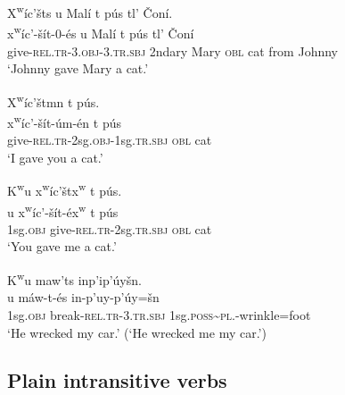 \documentclass[output=paper,colorlinks,citecolor=brown]{langscibook}
\begin{document}
\ea 
\label{ex-thomason-7}
X\textsuperscript w\'ic'\v{s}ts {\textltilde}u Mal\'i t p\'us tl' \v{C}on\'i. \\
\gll x\textsuperscript w\'ic'-\v{s}\'it-0-\'es {\textltilde}u Mal\'i t p\'us tl' \v{C}on\'i\\
     give-\textsc{rel.tr}-3.\textsc{obj}-3.\textsc{tr.sbj} 2ndary Mary \textsc{  obl} cat from Johnny\\
\glt `Johnny gave Mary a cat.' \\
\z

\ea X\textsuperscript w\'ic'\v{s}tmn t p\'us.  \\
\label{ex-thomason-8}
\gll x\textsuperscript w\'ic'-\v{s}\'it-\'um-\'en t p\'us\\
give-\textsc{rel.tr}-2sg.\textsc{obj}-1sg.\textsc{tr.sbj} \textsc{obl} cat\\
\glt `I gave you a
cat.'
\z

\ea 
\label{ex-thomason-9}
{K\textsuperscript w}u x\textsuperscript w\'ic'\v{s}tx\textsuperscript w t  p\'us. \\
 u x\textsuperscript
w\'ic'-\v{s}\'it-\'ex\textsuperscript w t p\'us\\
1sg.\textsc{obj} give-\textsc{rel.tr}-2sg.\textsc{tr.sbj} \textsc{obl} cat \\
 \glt  `You gave me a cat.'\\
 \z

\ea 
\label{ex-thomason-10}
{K\textsuperscript w}u maw'{\textltilde}ts inp'ip'\'uy\v{s}n. \\
u m\'aw-{\textltilde}t-\'es in-p'uy-p'\'uy=\v{s}n\\
     1sg.\textsc{obj} break-\textsc{rel.tr}-3.\textsc{tr.sbj} 1sg.\textsc{poss}\textasciitilde{}\textsc{pl}.-wrinkle=foot \\
\glt `He wrecked my car.' (`He wrecked me my car.')
\z
{}


\subsection{Plain intransitive verbs}  %
\label{thomason_section_2.3}
\end{document}
